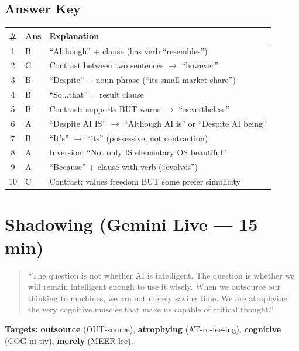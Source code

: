 \documentclass[10pt,a4paper]{article}
\begin{document}
\subsection*{Answer Key}

\begin{center}
\begin{tabular}{cll}
\toprule
\# & Ans & Explanation \\
\midrule
1 & B & ``Although'' + clause (has verb ``resembles'') \\
2 & C & Contrast between two sentences $\to$ ``however'' \\
3 & B & ``Despite'' + noun phrase (``its small market share'') \\
4 & B & ``So...that'' = result clause \\
5 & B & Contrast: supports BUT warns $\to$ ``nevertheless'' \\
6 & A & ``Despite AI IS'' $\to$ ``Although AI is'' or ``Despite AI being'' \\
7 & B & ``It's'' $\to$ ``its'' (possessive, not contraction) \\
8 & A & Inversion: ``Not only IS elementary OS beautiful'' \\
9 & A & ``Because'' + clause with verb (``evolves'') \\
10 & C & Contrast: values freedom BUT some prefer simplicity \\
\bottomrule
\end{tabular}
\end{center}

\section*{Shadowing (Gemini Live --- 15 min)}

\begin{quote}\small
``The question is not whether AI is intelligent. The question is
whether we will remain intelligent enough to use it wisely. When
we outsource our thinking to machines, we are not merely saving
time. We are atrophying the very cognitive muscles that make us
capable of critical thought.''
\end{quote}

\textbf{Targets:} \textbf{outsource} (OUT-source), \textbf{atrophying}
(AT-ro-fee-ing), \textbf{cognitive} (COG-ni-tiv), \textbf{merely}
(MEER-lee).
\end{document}
